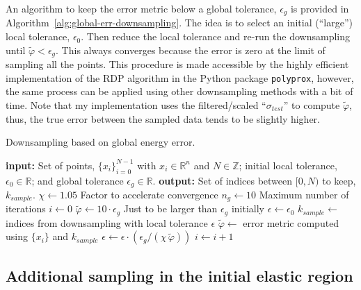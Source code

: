 \documentclass[a4paper,11pt]{article}
\begin{document}
An algorithm to keep the error metric below a global tolerance, $\epsilon_g$ is provided in Algorithm~\ref{alg:global-err-downsampling}.
The idea is to select an initial (``large'') local tolerance, $\epsilon_0$.
Then reduce the local tolerance and re-run the downsampling until $\tilde{\varphi} < \epsilon_{g}$.
This always converges because the error is zero at the limit of sampling all the points.
This procedure is made accessible by the highly efficient implementation of the RDP algorithm in the Python package \texttt{polyprox}, however, the same process can be applied using other downsampling methods with a bit of time.
Note that my implementation uses the filtered/scaled ``$\sigma_{test}$'' to compute $\tilde{\varphi}$, thus, the true error between the sampled data tends to be slightly higher.

\begin{algorithm}
	\caption{Downsampling based on global energy error.}
	\label{alg:global-err-downsampling}
	\begin{algorithmic}[1]
		\State \textbf{input:} Set of points, $\{x_i\}_{i=0}^{N-1}$ with $x_i \in \mathbb{R}^n$ and $N \in \mathbb{Z}$; initial local tolerance, $\epsilon_0 \in \mathbb{R}$; and
        global tolerance $\epsilon_g \in \mathbb{R}$.
        \State \textbf{output:} Set of indices between $[0, N)$ to keep, $k_{sample}$.
        \State $\chi \gets 1.05$
        \Comment Factor to accelerate convergence
        \State $n_g \gets 10$
        \Comment Maximum number of iterations
        \State $i \gets 0$
        \State $\tilde{\varphi} \gets 10 \cdot \epsilon_g$
        \Comment Just to be larger than $\epsilon_g$ initially
        \State $\epsilon \gets \epsilon_0$
            \State $k_{sample} \gets$ indices from downsampling with local tolerance $\epsilon$
            \State $\tilde{\varphi} \gets$ error metric computed using $\{x_i\}$ and $k_{sample}$
                \State $\epsilon \gets \epsilon \cdot (\epsilon_g / (\chi \, \tilde{\varphi}))$
                \State $i \gets i + 1$
            \EndIf
		\EndWhile
\end{algorithmic}
\end{algorithm}

\subsection{Additional sampling in the initial elastic region}
\end{document}
